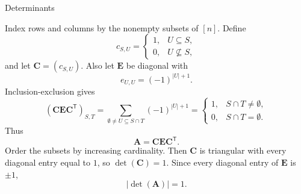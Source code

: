 \begin{expectedproblemgroup}{Determinants}
        \begin{expectedsubsolution}
            Index rows and columns by the nonempty subsets of $[n]$. Define
            \[
                c_{S,U}
                =
                \begin{cases}
                    1, & U\subseteq S,\\
                    0, & U\nsubseteq S,
                \end{cases}
            \]
            and let $\mathbf{C}=(c_{S,U})$. Also let $\mathbf{E}$ be diagonal with
            \[
                e_{U,U}=(-1)^{|U|+1}.
            \]
            Inclusion-exclusion gives
            \[
                (\mathbf{C}\mathbf{E}\mathbf{C}^{\mathsf{T}})_{S,T}
                =
                \sum_{\emptyset\neq U\subseteq S\cap T}(-1)^{|U|+1}
                =
                \begin{cases}
                    1, & S\cap T\neq\emptyset,\\
                    0, & S\cap T=\emptyset.
                \end{cases}
            \]
            Thus
            \[
                \mathbf{A}=\mathbf{C}\mathbf{E}\mathbf{C}^{\mathsf{T}}.
            \]
            Order the subsets by increasing cardinality. Then $\mathbf{C}$ is
            triangular with every diagonal entry equal to $1$, so
            $\det(\mathbf{C})=1$. Since every diagonal entry of $\mathbf{E}$ is
            $\pm1$,
            \[
                \boxed{|\det(\mathbf{A})|=1}.
            \]
        \end{expectedsubsolution}

    \end{expectedproblemgroup}

